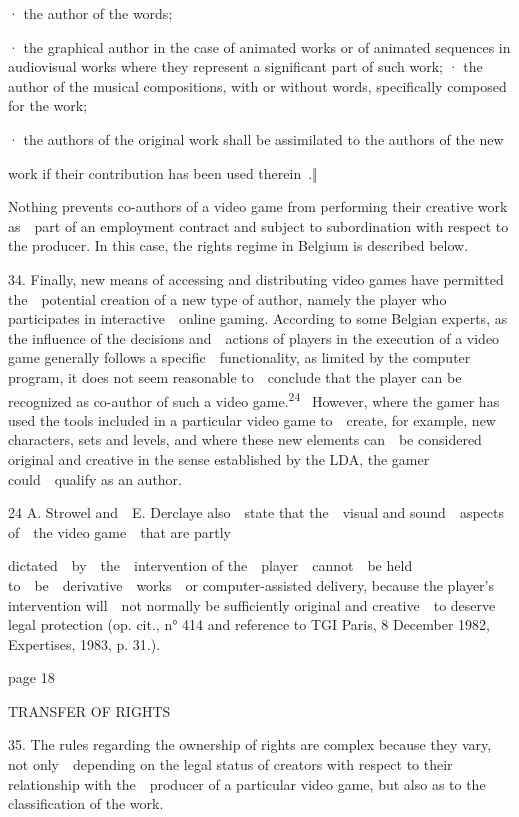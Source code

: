 \documentclass[
]{article}
\begin{document}
{· the author of the words;}

{· the graphical author in the case of animated works or of animated
sequences in audiovisual works where they represent a significant part
of such work; · the author of the musical compositions, with or without
words, specifically composed for the work;}

{· the authors of the original work shall be assimilated to the authors
of the new}

{work if their contribution has been used therein}{~.‖}

{Nothing prevents co-authors of a video game from performing their
creative work as~~part of an employment contract and subject to
subordination with respect to the producer. In this case, the rights
regime in Belgium is described below.}

{34. }{Finally, new means of accessing and distributing video games have
permitted the~~potential creation of a new type of author, namely the
player who participates in interactive~~online gaming. According to some
Belgian experts, as the influence of the decisions and~~actions of
players in the execution of a video game generally follows a
specific~~functionality, as limited by the computer program, it does not
seem reasonable to~~conclude that the player can be recognized as
co-author of such a video game.}\textsuperscript{{24 }}{~However, where
the gamer has used the tools included in a particular video game
to~~create, for example, new characters, sets and levels, and where
these new elements can~~be considered original and creative in the sense
established by the LDA, the gamer could~~qualify as an author.}

{24 }{A. Strowel and~~E. Derclaye also~~state that the~~visual and
sound~~aspects of~~the video game~~that are partly}

{dictated~~by~~the~~intervention of the~~player~~cannot~~be held
to~~be~~derivative~~works~~or computer-assisted delivery, because the
player}{'s }{intervention will~~not normally be sufficiently original
and creative~~to deserve legal protection (}{op. cit.}{, n° 414 and
reference to TGI Paris, 8 December 1982, Expertises, 1983, p. 31.).}

{page 18}

{TRANSFER OF RIGHTS}

{35. }{The rules regarding the ownership of rights are complex because
they vary, not only~~depending on the legal status of creators with
respect to their relationship with the~~producer of a particular video
game, but also as to the classification of the work.}
\end{document}
